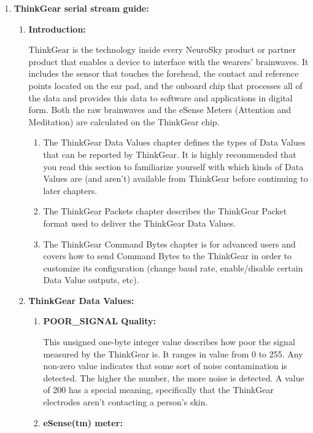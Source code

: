\documentclass[12pt]{article}
\begin{document}
\begin{enumerate}
	\item \textbf{{\large ThinkGear serial stream guide:}}

\begin{enumerate}
	\item \textbf{Introduction:}



ThinkGear is the technology inside every NeuroSky product or partner product that enables a device to interface with the wearers’ brainwaves. It includes the sensor that touches the forehead, the contact and reference points located on the ear pad, and the onboard chip that processes all of the data and provides this data to software and applications in digital form. Both the raw brainwaves and the eSense Meters (Attention and Meditation) are calculated on the ThinkGear chip.

\begin{enumerate}
	\item 	The ThinkGear Data Values chapter defines the types of Data Values that can be reported by ThinkGear. It is highly recommended that you read this section to familiarize yourself with which kinds of Data Values are (and aren't) available from ThinkGear before continuing to later chapters.
	
	\item The ThinkGear Packets chapter describes the ThinkGear Packet format used to deliver the ThinkGear Data Values.
	\item The ThinkGear Command Bytes chapter is for advanced users and covers how to send Command Bytes to the ThinkGear in order to customize its configuration (change baud rate, enable/disable certain Data Value outputs, etc).
\end{enumerate}


	\item \textbf{{\small ThinkGear Data Values:}}


\begin{enumerate}
	\item \textbf{POOR\_SIGNAL Quality:}


{\raggedright
This unsigned one-byte integer value describes how poor the signal measured by the ThinkGear is. It ranges in value from 0 to 255. Any non-zero value indicates that some sort of noise contamination is detected. The higher the number, the more noise is detected. A value of 200 has a special meaning, specifically that the ThinkGear electrodes aren't contacting a person's skin.
}


	\item \textbf{eSense(tm) meter:}


\end{enumerate}
\end{enumerate}
\end{enumerate}
\end{document}
